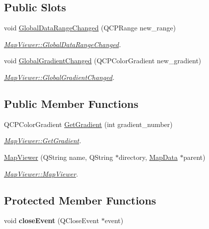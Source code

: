 \subsection*{Public Slots}
\begin{DoxyCompactItemize}
\item 
void \hyperlink{class_map_viewer_a07803ea58b8609639e9a9950021c041c}{Global\+Data\+Range\+Changed} (Q\+C\+P\+Range new\+\_\+range)
\begin{DoxyCompactList}\small\item\em \hyperlink{class_map_viewer_a07803ea58b8609639e9a9950021c041c}{Map\+Viewer\+::\+Global\+Data\+Range\+Changed}. \end{DoxyCompactList}\item 
void \hyperlink{class_map_viewer_ad9fe700fcec6639713adb177c8775c6d}{Global\+Gradient\+Changed} (Q\+C\+P\+Color\+Gradient new\+\_\+gradient)
\begin{DoxyCompactList}\small\item\em \hyperlink{class_map_viewer_ad9fe700fcec6639713adb177c8775c6d}{Map\+Viewer\+::\+Global\+Gradient\+Changed}. \end{DoxyCompactList}\end{DoxyCompactItemize}
\subsection*{Public Member Functions}
\begin{DoxyCompactItemize}
\item 
Q\+C\+P\+Color\+Gradient \hyperlink{class_map_viewer_a9a1662d27539b588c2702f8564f8fb3c}{Get\+Gradient} (int gradient\+\_\+number)
\begin{DoxyCompactList}\small\item\em \hyperlink{class_map_viewer_a9a1662d27539b588c2702f8564f8fb3c}{Map\+Viewer\+::\+Get\+Gradient}. \end{DoxyCompactList}\item 
\hyperlink{class_map_viewer_a1119962bac763f5849517f0a88b36e64}{Map\+Viewer} (Q\+String name, Q\+String $\ast$directory, \hyperlink{class_map_data}{Map\+Data} $\ast$parent)
\begin{DoxyCompactList}\small\item\em \hyperlink{class_map_viewer_a1119962bac763f5849517f0a88b36e64}{Map\+Viewer\+::\+Map\+Viewer}. \end{DoxyCompactList}\end{DoxyCompactItemize}
\subsection*{Protected Member Functions}
\begin{DoxyCompactItemize}
\item 
\hypertarget{class_map_viewer_a9c0d036ff4695a6da7a2827e6c646c64}{void {\bfseries close\+Event} (Q\+Close\+Event $\ast$event)}\label{class_map_viewer_a9c0d036ff4695a6da7a2827e6c646c64}

\end{DoxyCompactItemize}


